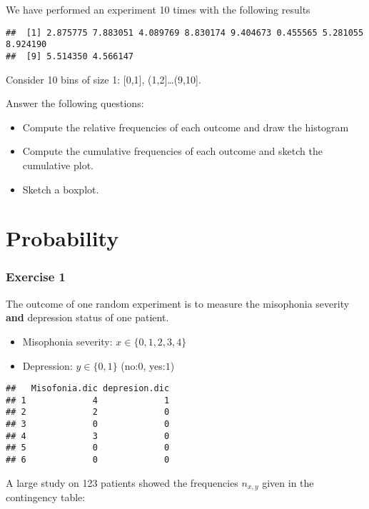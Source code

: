\documentclass[
]{book}
\providecommand{\tightlist}{%
  \setlength{\itemsep}{0pt}\setlength{\parskip}{0pt}}
\begin{document}
We have performed an experiment 10 times with the following results

\begin{verbatim}
##  [1] 2.875775 7.883051 4.089769 8.830174 9.404673 0.455565 5.281055 8.924190
##  [9] 5.514350 4.566147
\end{verbatim}

Consider 10 bins of size 1: {[}0,1{]}, (1,2{]}\ldots(9,10{]}.

Answer the following questions:

\begin{itemize}
\item
  Compute the relative frequencies of each outcome and draw the histogram
\item
  Compute the cumulative frequencies of each outcome and sketch the cumulative plot.
\item
  Sketch a boxplot.
\end{itemize}

\hypertarget{probability-3}{%
\section{Probability}\label{probability-3}}

\hypertarget{exercise-1-1}{%
\subsubsection{Exercise 1}\label{exercise-1-1}}

The outcome of one random experiment is to measure the misophonia severity \textbf{and} depression status of one patient.

\begin{itemize}
\tightlist
\item
  Misophonia severity: \(x\in \{0,1,2,3,4\}\)
\item
  Depression: \(y\in \{0,1\}\) (no:\(0\), yes:\(1\))
\end{itemize}

\begin{verbatim}
##   Misofonia.dic depresion.dic
## 1             4             1
## 2             2             0
## 3             0             0
## 4             3             0
## 5             0             0
## 6             0             0
\end{verbatim}

A large study on 123 patients showed the frequencies \(n_{x,y}\) given in the contingency table:
\end{document}
